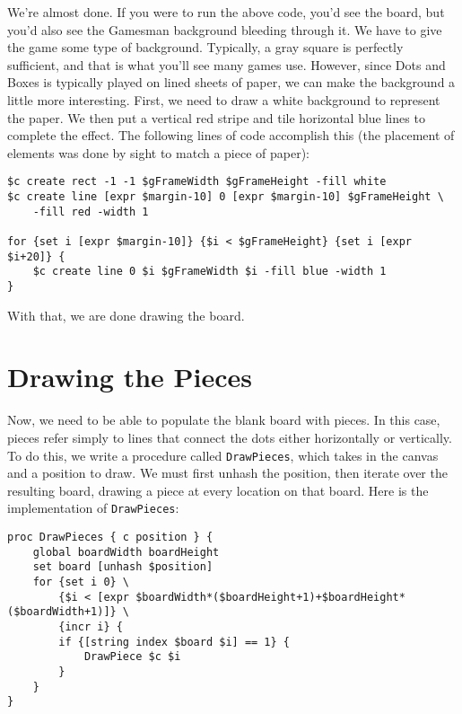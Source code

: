 \documentclass{article}
\begin{document}
We're almost done. If you were to run the above code, you'd see the board, but you'd also see the Gamesman background bleeding through it. We have to give the game some type of background. Typically, a gray square is perfectly sufficient, and that is what you'll see many games use. However, since Dots and Boxes is typically played on lined sheets of paper, we can make the background a little more interesting. First, we need to draw a white background to represent the paper. We then put a vertical red stripe and tile horizontal blue lines to complete the effect. The following lines of code accomplish this (the placement of elements was done by sight to match a piece of paper):

\begin{verbatim}
$c create rect -1 -1 $gFrameWidth $gFrameHeight -fill white
$c create line [expr $margin-10] 0 [expr $margin-10] $gFrameHeight \
    -fill red -width 1
    
for {set i [expr $margin-10]} {$i < $gFrameHeight} {set i [expr $i+20]} {
    $c create line 0 $i $gFrameWidth $i -fill blue -width 1
}
\end{verbatim}

With that, we are done drawing the board.


\section{Drawing the Pieces}

Now, we need to be able to populate the blank board with pieces. In this case, pieces refer simply to lines that connect the dots either horizontally or vertically. To do this, we write a procedure called \texttt{DrawPieces}, which takes in the canvas and a position to draw. We must first unhash the position, then iterate over the resulting board, drawing a piece at every location on that board. Here is the implementation of \texttt{DrawPieces}:

\begin{verbatim}
proc DrawPieces { c position } {
    global boardWidth boardHeight
    set board [unhash $position]
    for {set i 0} \
        {$i < [expr $boardWidth*($boardHeight+1)+$boardHeight*($boardWidth+1)]} \
        {incr i} {
        if {[string index $board $i] == 1} {
            DrawPiece $c $i
        }
    }
}
\end{verbatim}
\end{document}
